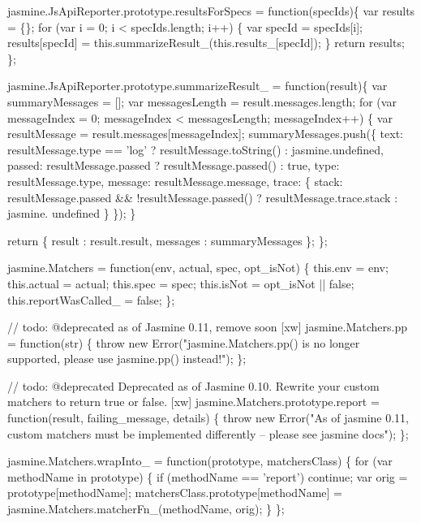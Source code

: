 \begin{DoxyCodeInclude}
jasmine.JsApiReporter.prototype.resultsForSpecs = \textcolor{keyword}{function}(specIds)\{
  var results = \{\};
  \textcolor{keywordflow}{for} (var i = 0; i < specIds.length; i++) \{
    var specId = specIds[i];
    results[specId] = this.summarizeResult\_(this.results\_[specId]);
  \}
  \textcolor{keywordflow}{return} results;
\};

jasmine.JsApiReporter.prototype.summarizeResult\_ = \textcolor{keyword}{function}(result)\{
  var summaryMessages = [];
  var messagesLength = result.messages.length;
  \textcolor{keywordflow}{for} (var messageIndex = 0; messageIndex < messagesLength; messageIndex++) \{
    var resultMessage = result.messages[messageIndex];
    summaryMessages.push(\{
      text: resultMessage.type == \textcolor{stringliteral}{'log'} ? resultMessage.toString() : jasmine.undefined,
      passed: resultMessage.passed ? resultMessage.passed() : \textcolor{keyword}{true},
      type: resultMessage.type,
      message: resultMessage.message,
      trace: \{
        stack: resultMessage.passed && !resultMessage.passed() ? resultMessage.trace.stack : jasmine.
      undefined
      \}
    \});
  \}

  \textcolor{keywordflow}{return} \{
    result : result.result,
    messages : summaryMessages
  \};
\};

jasmine.Matchers = \textcolor{keyword}{function}(env, actual, spec, opt\_isNot) \{
  this.env = env;
  this.actual = actual;
  this.spec = spec;
  this.isNot = opt\_isNot || \textcolor{keyword}{false};
  this.reportWasCalled\_ = \textcolor{keyword}{false};
\};

\textcolor{comment}{// todo: @deprecated as of Jasmine 0.11, remove soon [xw]}
jasmine.Matchers.pp = \textcolor{keyword}{function}(str) \{
  \textcolor{keywordflow}{throw} \textcolor{keyword}{new} Error(\textcolor{stringliteral}{"jasmine.Matchers.pp() is no longer supported, please use jasmine.pp() instead!"});
\};

\textcolor{comment}{// todo: @deprecated Deprecated as of Jasmine 0.10. Rewrite your custom matchers to return true or false.
       [xw]}
jasmine.Matchers.prototype.report = \textcolor{keyword}{function}(result, failing\_message, details) \{
  \textcolor{keywordflow}{throw} \textcolor{keyword}{new} Error(\textcolor{stringliteral}{"As of jasmine 0.11, custom matchers must be implemented differently -- please see
       jasmine docs"});
\};

jasmine.Matchers.wrapInto\_ = \textcolor{keyword}{function}(prototype, matchersClass) \{
  \textcolor{keywordflow}{for} (var methodName in prototype) \{
    \textcolor{keywordflow}{if} (methodName == \textcolor{stringliteral}{'report'}) \textcolor{keywordflow}{continue};
    var orig = prototype[methodName];
    matchersClass.prototype[methodName] = jasmine.Matchers.matcherFn\_(methodName, orig);
  \}
\};


\end{DoxyCodeInclude}
